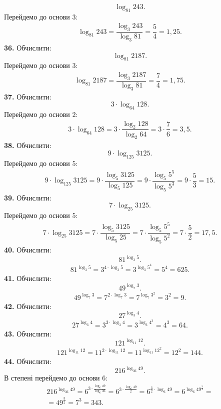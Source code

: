 $$
\log_{81}243.
$$
Перейдемо до основи $3$:
\begin{gather*}
\log_{81}243=
\dfrac{\log_{3}243}{\log_{3}81}=
\dfrac{5}{4}=1,25.
\end{gather*}
\textbf{36.} Обчислити:
$$
\log_{81}2187.
$$
Перейдемо до основи $3$:
\begin{gather*}
\log_{81}2187=
\dfrac{\log_{3}2187}{\log_{3}81}=
\dfrac{7}{4}=1,75.
\end{gather*}
\textbf{37.} Обчислити:
$$
3\cdot\log_{64}128.
$$
Перейдемо до основи $2$:
\begin{gather*}
3\cdot\log_{64}128=
3\cdot\dfrac{\log_{2}128}{\log_{2}64}=
3\cdot\dfrac{7}{6}=3,5.
\end{gather*}
\textbf{38.} Обчислити:
$$
9\cdot\log_{125}3125.
$$
Перейдемо до основи $5$:
\begin{gather*}
9\cdot\log_{125}3125=
9\cdot\dfrac{\log_{5}3125}{\log_{5}125}=
9\cdot\dfrac{\log_{5}5^5}{\log_{5}5^3}=
9\cdot\dfrac{5}{3}=15.
\end{gather*}
\textbf{39.} Обчислити:
$$
7\cdot\log_{25}3125.
$$
Перейдемо до основи $5$:
\begin{gather*}
7\cdot\log_{25}3125=
7\cdot\dfrac{\log_{5}3125}{\log_{5}25}=
7\cdot\dfrac{\log_{5}5^5}{\log_{5}5^2}=
7\cdot\dfrac{5}{2}=17,5.
\end{gather*}
\textbf{40.} Обчислити:
$$
81^{\log_{3}5}.
$$
\begin{gather*}
81^{\log_{3}5}=
3^{4\cdot\log_{3}5}=
3^{\log_{3}5^4}=
5^4=625.
\end{gather*}
\textbf{41.} Обчислити:
$$
49^{\log_{7}3}.
$$
\begin{gather*}
49^{\log_{7}3}=
7^{2\cdot\log_{7}3}=
7^{\log_{7}3^2}=
3^2=9.
\end{gather*}
\textbf{42.} Обчислити:
$$
27^{\log_{3}4}.
$$
\begin{gather*}
27^{\log_{3}4}=
3^{3\cdot\log_{3}4}=
3^{\log_{3}4^3}=
4^3=64.
\end{gather*}
\textbf{43.} Обчислити:
$$
121^{\log_{11}12}.
$$
\begin{gather*}
121^{\log_{11}12}=
11^{2\cdot\log_{11}12}=
11^{\log_{11}12^2}=
12^2=144.
\end{gather*}
\textbf{44.} Обчислити:
$$
216^{\log_{36}49}.
$$
В степені перейдемо до основи $6$:
\begin{multline*}
216^{\log_{36}49}=
6^{3\cdot\frac{\log_{6}49}{\log_{6}36}}=
6^{3\cdot\frac{\log_{6}49}{2}}=
6^{\frac{3}{2}\cdot\log_{6}49}=
6^{\log_{6}49^{\frac{3}{2}}}=\\
=49^{\frac{3}{2}}=7^3=343.
\end{multline*}
